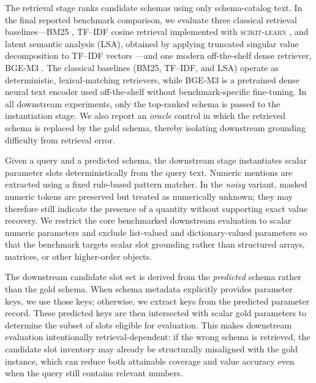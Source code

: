 \documentclass[3p]{elsarticle}
\begin{document}
The retrieval stage ranks candidate schemas using only schema-catalog text. In the final reported benchmark comparison, we evaluate three classical retrieval baselines---BM25 \cite{robertson2009bm25}, TF--IDF cosine retrieval implemented with \textsc{scikit-learn} \cite{pedregosa2011sklearn}, and latent semantic analysis (LSA), obtained by applying truncated singular value decomposition to TF--IDF vectors \cite{deerwester1990lsa}---and one modern off-the-shelf dense retriever, BGE-M3 \cite{chen2024m3embedding}. The classical baselines (BM25, TF--IDF, and LSA) operate as deterministic, lexical-matching retrievers, while BGE-M3 is a pretrained dense neural text encoder used off-the-shelf without benchmark-specific fine-tuning. In all downstream experiments, only the top-ranked schema is passed to the instantiation stage. We also report an \emph{oracle} control in which the retrieved schema is replaced by the gold schema, thereby isolating downstream grounding difficulty from retrieval error.

Given a query and a predicted schema, the downstream stage instantiates scalar parameter slots deterministically from the query text. Numeric mentions are extracted using a fixed rule-based pattern matcher. In the \emph{noisy} variant, masked numeric tokens are preserved but treated as numerically unknown; they may therefore still indicate the presence of a quantity without supporting exact value recovery. We restrict the core benchmarked downstream evaluation to scalar numeric parameters and exclude list-valued and dictionary-valued parameters so that the benchmark targets scalar slot grounding rather than structured arrays, matrices, or other higher-order objects.

The downstream candidate slot set is derived from the \emph{predicted} schema rather than the gold schema. When schema metadata explicitly provides parameter keys, we use those keys; otherwise, we extract keys from the predicted parameter record. These predicted keys are then intersected with scalar gold parameters to determine the subset of slots eligible for evaluation. This makes downstream evaluation intentionally retrieval-dependent: if the wrong schema is retrieved, the candidate slot inventory may already be structurally misaligned with the gold instance, which can reduce both attainable coverage and value accuracy even when the query still contains relevant numbers.
\end{document}
